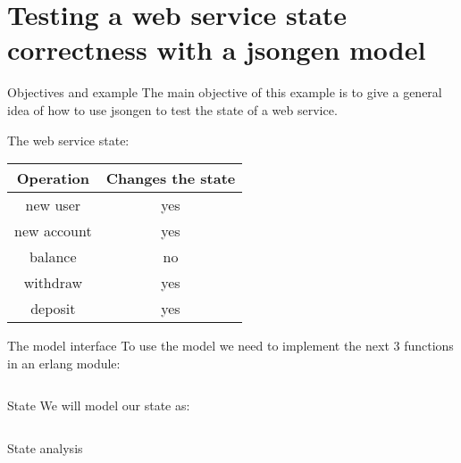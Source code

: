 \section{Testing a web service state correctness with a jsongen model}

\begin{frame}{Objectives and example}
  The main objective of this example is to give a general idea of how
  to use jsongen to test the state of a web service.

  The web service state:\\

  \centering
  \begin{tabular}{| c | c |}
    \hline
    \textbf{Operation}   & \textbf{Changes the state} \\ \hline
    new user    & yes \\ \hline
    new account & yes \\ \hline
    balance     & no \\ \hline
    withdraw    & yes \\ \hline
    deposit     & yes \\ \hline
  \end{tabular}
  \centering
\end{frame}

\begin{frame}{The model interface}
  To use the model we need to implement the next 3 functions in an
  erlang module:

  \inputminted{erlang}{./code/interface.erl}
\end{frame}

\begin{frame}{State}
  We will model our state as:

  \inputminted{erlang}{./code/state.erl}
\end{frame}

\begin{frame}{State analysis}
  \begin{figure}
    \centering
    \begin{overprint}[\textwidth]
    \end{overprint}
  \end{figure}
\end{frame}


